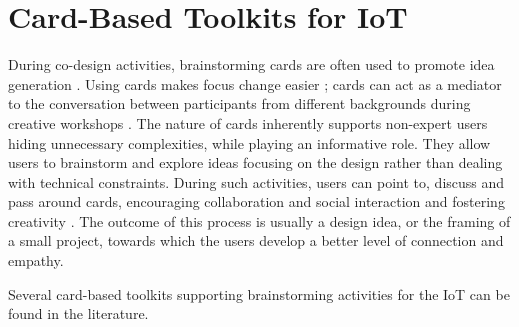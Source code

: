 \section{Card-Based Toolkits for IoT}

During co-design activities, brainstorming cards are often used to promote idea generation \autocite{vaajakallio_design_2014}.
Using cards makes focus change easier \autocite{hornecker_creative_2010}; cards can act as a mediator to the conversation between participants from different backgrounds during creative workshops \autocite{carneiro_io_2011}.
The nature of cards inherently supports non-expert users hiding unnecessary complexities, while playing an informative role. They allow users to brainstorm and explore ideas focusing on the design rather than dealing with technical constraints. During such activities, users can point to, discuss and pass around cards, encouraging collaboration and social interaction and fostering creativity \autocite{carneiro_io_2011}. The outcome of this process is usually a design idea, or the framing of a small project, towards which the users develop a better level of connection and empathy.

Several card-based toolkits supporting brainstorming activities for the IoT can be found in the literature.

